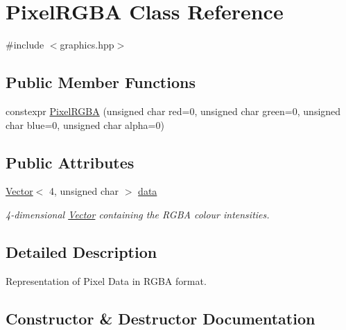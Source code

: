 \hypertarget{class_pixel_r_g_b_a}{}\section{Pixel\+R\+G\+BA Class Reference}
\label{class_pixel_r_g_b_a}


{\ttfamily \#include $<$graphics.\+hpp$>$}

\subsection*{Public Member Functions}
\begin{DoxyCompactItemize}
\item 
constexpr \mbox{\hyperlink{class_pixel_r_g_b_a_a69b64de852cd399a459b6924e8b3c440}{Pixel\+R\+G\+BA}} (unsigned char red=0, unsigned char green=0, unsigned char blue=0, unsigned char alpha=0)
\end{DoxyCompactItemize}
\subsection*{Public Attributes}
\begin{DoxyCompactItemize}
\item 
\mbox{\label{class_pixel_r_g_b_a_af63a7dbd51f6a4a0096626f4111ce62e}} 
\mbox{\hyperlink{class_vector}{Vector}}$<$ 4, unsigned char $>$ \mbox{\hyperlink{class_pixel_r_g_b_a_af63a7dbd51f6a4a0096626f4111ce62e}{data}}
\begin{DoxyCompactList}\small\item\em 4-\/dimensional \mbox{\hyperlink{class_vector}{Vector}} containing the R\+G\+BA colour intensities. \end{DoxyCompactList}\end{DoxyCompactItemize}


\subsection{Detailed Description}
Representation of Pixel Data in R\+G\+BA format. 

\subsection{Constructor \& Destructor Documentation}
\mbox{\label{class_pixel_r_g_b_a_a69b64de852cd399a459b6924e8b3c440}} 
